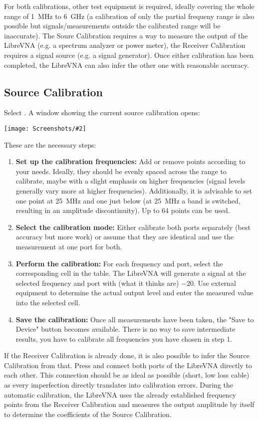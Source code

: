 \documentclass[a4paper,11pt]{article}
\newcommand{\vna}{LibreVNA}
\newcommand{\screenshot}[2]{\begin{center}
\texttt{[image: Screenshots/\#2]}
\end{center}}
\begin{document}
For both calibrations, other test equipment is required, ideally covering the whole range of \SI{1}{\mega\hertz} to \SI{6}{\giga\hertz} (a calibration of only the partial frequeny range is also possible but signals/measurements outside the calibrated range will be inaccurate). The Soure Calibration requires a way to measure the output of the \vna{} (e.g. a spectrum analyzer or power meter), the Receiver Calibration requires a signal source (e.g. a signal generator). Once either calibration has been completed, the \vna{} can also infer the other one with reasonable accuracy.

\subsection{Source Calibration}
Select . A window showing the current source calibration opens:
\screenshot{1.0}{SourceCalibration.png}
These are the necessary steps:
\begin{enumerate}
\item \textbf{Set up the calibration frequencies:} Add or remove points according to your needs. Ideally, they should be evenly spaced across the range to calibrate, maybe with a slight emphasis on higher frequencies (signal levels generally vary more at higher frequencies). Additionally, it is advisable to set one point at \SI{25}{\mega\hertz} and one just below (at \SI{25}{\mega\hertz} a band is switched, resulting in an amplitude discontinuity). Up to 64 points can be used.
\item \textbf{Select the calibration mode:} Either calibrate both ports separately (best accuracy but more work) or assume that they are identical and use the measurement at one port for both.
\item \textbf{Perform the calibration:} For each frequency and port, select the corresponding cell in the table. The \vna{} will generate a signal at the selected frequency and port with (what it thinks are) \SI{-20}{\dBm}. Use external equipment to determine the actual output level and enter the measured value into the selected cell.
\item \textbf{Save the calibration:} Once all measurements have been taken, the "Save to Device" button becomes available. There is no way to save intermediate results, you have to calibrate all frequencies you have chosen in step 1.
\end{enumerate}
If the Receiver Calibration is already done, it is also possible to infer the Source Calibration from that. Press  and connect both ports of the \vna{} directly to each other. This connection should be as ideal as possible (short, low loss cable) as every imperfection directly translates into calibration errors. During the automatic calibration, the \vna{} uses the already established frequency points from the Receiver Calibration and measures the output amplitude by itself to determine the coefficients of the Source Calibration.
\end{document}

